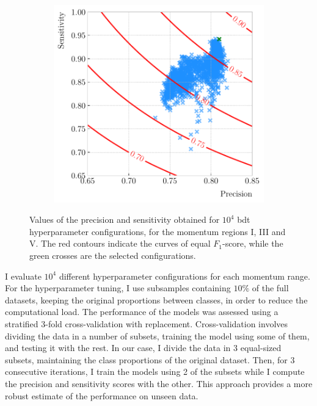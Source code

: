 \begin{figure}[t]
\begin{subfigure}{0.32\textwidth}
	\end{subfigure}
	\begin{subfigure}{0.32\textwidth}
		\centering
		\includegraphics[width=.99\linewidth]{Images/GArSoft_PID/BDT/precision_vs_sensitivity_p0_6.50_sigmap_3.50.pdf}
	\end{subfigure}
	\caption[Values of the precision and sensitivity obtained for $10^{4}$ \gls{bdt} hyperparameter configurations, for the momentum regions I, III and V.]{Values of the precision and sensitivity obtained for $10^{4}$ \gls{bdt} hyperparameter configurations, for the momentum regions I, III and V. The red contours indicate the curves of equal $F_{1}$-score, while the green crosses are the selected configurations.}
	\label{fig:hyper_precision_sensitivity}
\end{figure}

I evaluate $10^{4}$ different hyperparameter configurations for each momentum range. For the hyperparameter tuning, I use subsamples containing $10\%$ of the full datasets, keeping the original proportions between classes, in order to reduce the computational load. The performance of the models was assessed using a stratified 3-fold cross-validation with replacement. Cross-validation involves dividing the data in a number of subsets, training the model using some of them, and testing it with the rest. In our case, I divide the data in 3 equal-sized subsets, maintaining the class proportions of the original dataset. Then, for 3 consecutive iterations, I train the models using 2 of the subsets while I compute the precision and sensitivity scores with the other. This approach provides a more robust estimate of the performance on unseen data.

